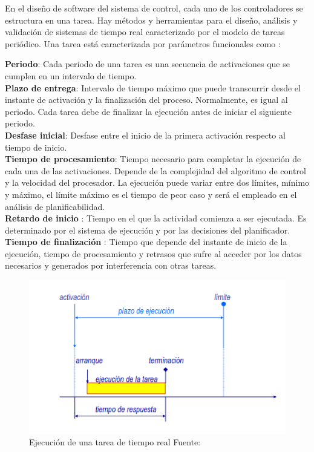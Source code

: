 \documentclass[12pt]{article}
\begin{document}

En el diseño de software del sistema de control, cada uno de los controladores se estructura en una tarea. Hay métodos y herramientas para el diseño, análisis y validación de sistemas de tiempo real caracterizado por el modelo de tareas periódico. Una tarea está caracterizada por parámetros funcionales como \cite{alonso2010panoramica}: 


\textbf{Periodo}: Cada periodo de una tarea es una secuencia de activaciones que se cumplen en un intervalo de tiempo.\\
\textbf{Plazo de entrega}:  Intervalo de tiempo máximo que puede transcurrir desde el instante de activación y la finalización del proceso. Normalmente, es igual al periodo. Cada tarea debe de finalizar la ejecución antes de iniciar el siguiente periodo. \\
\textbf{Desfase inicial}: Desfase entre el inicio de la primera activación respecto al tiempo de inicio.\\
\textbf{Tiempo de procesamiento}: Tiempo necesario para completar la ejecución de cada una de las activaciones. Depende de la complejidad del algoritmo de control y la velocidad del procesador. La ejecución puede variar entre dos límites, mínimo y máximo, el límite máximo es el tiempo de peor caso y será el empleado en el análisis de planificabilidad.\\
\textbf{Retardo de inicio} : Tiempo en el que la actividad comienza a ser ejecutada. Es determinado por el sistema de ejecución y por las decisiones del planificador. \\
\textbf{Tiempo de finalización} : Tiempo que depende del instante de inicio de la ejecución, tiempo de procesamiento y retrasos que sufre al acceder por los datos necesarios y generados por interferencia con otras tareas. \\


\begin{figure}[!ht]
  \centering
  \includegraphics[scale=0.5]{diagramas/tiempo_real.png}
  \caption{Ejecución de una tarea de tiempo real Fuente: \cite{de2000introduccion}}
  \label{fig:diagrama_tiempo_real}
\end{figure}
\end{document}
